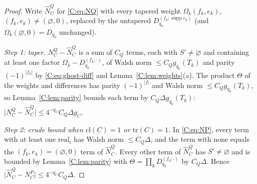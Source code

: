 \documentclass[11pt]{article}
\newcommand{\abs}[1]{\lvert #1\rvert}
\newcommand{\real}{\mathrm{real}}
\begin{document}
\begin{proof}
Write \(\widehat N^Q_C\) for \eqref{C:eq:NQ} with every tapered weight
\(\Omega_k(f_k,e_k)\), \((f_k,e_k)\ne(\varnothing,0)\), replaced by the
untapered \(D^{(f_k;\operatorname{supp}e_k)}_{q_k}\) (and
\(\Omega_k(\varnothing,0)=D_{q_k}\) unchanged).

\emph{Step 1: taper.}  \(N^Q_C-\widehat N^Q_C\) is a sum of \(C_Q\) terms,
each with \(S'\ne\varnothing\) and containing at least one factor
\(\Omega_k-D^{(f_k;\cdot)}_{q_k}\), of Walsh norm \(\le C_Qg_{q_k}(T_k)\) and
parity \((-1)^{\abs{f_k}}\) by \eqref{C:eq:ghost-diff} and
Lemma~\ref{C:lem:weights}(a).  The product \(\Theta\) of the weights and
differences has parity \((-1)^{\abs f}\) and Walsh norm
\(\le C_Qg_{q_k}(T_k)\), so Lemma~\ref{C:lem:parity} bounds each term by
\(C_Q\Delta g_{q_k}(T_k)\): \(\abs{N^Q_C-\widehat N^Q_C}\le4^{-q_C}C_Q\Delta g_C\).

\emph{Step 2: crude bound when \(\mathrm{cl}(C)=1\) or \(\mathrm{tr}(C)=1\).}
In \eqref{C:eq:NP}, every term with at least one \(\real_i\) has Walsh norm
\(\le C_Q\Delta\), and the term with none equals the
\((f_k,e_k)=(\varnothing,0)\) term of \(\widehat N^Q_C\).  Every other term
of \(\widehat N^Q_C\) has \(S'\ne\varnothing\) and is bounded by
Lemma~\ref{C:lem:parity} with \(\Theta=\prod_kD^{(f_k;\cdot)}_{q_k}\) by
\(C_Q\Delta\).  Hence \(\abs{\widehat N^Q_C-N^P_C}\le4^{-q_C}C_Q\Delta\).


\end{proof}
\end{document}
